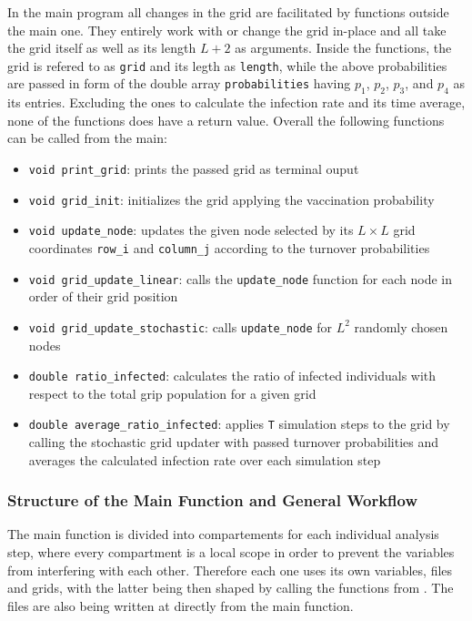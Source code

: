 In the main program all changes in the grid are facilitated by functions outside the main one. They entirely work with or change the grid in-place and all take the grid itself as well as its length $L+2$ as arguments.
Inside the functions, the grid is refered to as \texttt{grid} and its legth as \texttt{length}, while the above probabilities are passed in form of the double array \texttt{probabilities} having $p_1$, $p_2$, $p_3$, 
and $p_4$ as its entries. Excluding the ones to calculate the infection rate and its time average, none of the functions does have a return value. Overall the following functions can be called from the main:
\begin{itemize}
    \item \texttt{void print\_grid}: prints the passed grid as terminal ouput
    \item \texttt{void grid\_init}: initializes the grid applying the vaccination probability
    \item \texttt{void update\_node}: updates the given node selected by its $L\times L$ grid coordinates \texttt{row\_i} and \texttt{column\_j} according to the turnover probabilities
    \item \texttt{void grid\_update\_linear}: calls the \texttt{update\_node} function for each node in order of their grid position
    \item \texttt{void grid\_update\_stochastic}: calls \texttt{update\_node} for $L^2$ randomly chosen nodes
    \item \texttt{double ratio\_infected}: calculates the ratio of infected individuals with respect to the total grip population for a given grid
    \item \texttt{double average\_ratio\_infected}: applies \texttt{T} simulation steps to the grid by calling the stochastic grid updater with passed turnover probabilities 
    and averages the calculated infection rate over each simulation step
\end{itemize}


\subsubsection{Structure of the Main Function and General Workflow}

The main function is divided into compartements for each individual analysis step, where every compartment is a local scope in order to prevent the variables from interfering with each other.
Therefore each one uses its own variables, files and grids, with the latter being then shaped by calling the functions from . The files are also being written at
directly from the main function.


